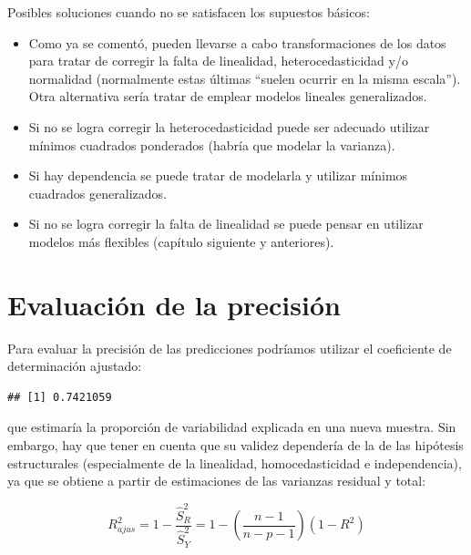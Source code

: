 \documentclass[
]{book}
\newenvironment{Shaded}{\begin{snugshade}}{\end{snugshade}}
\newcommand{\FunctionTok}[1]{\textcolor[rgb]{0.00,0.00,0.00}{#1}}
\newcommand{\NormalTok}[1]{#1}
\newcommand{\SpecialCharTok}[1]{\textcolor[rgb]{0.00,0.00,0.00}{#1}}
\theoremstyle{break}
\theoremstyle{definition}
\theoremstyle{definition}
\theoremstyle{definition}
\theoremstyle{definition}
\theoremstyle{remark}
\begin{document}
Posibles soluciones cuando no se satisfacen los supuestos básicos:

\begin{itemize}
\item
  Como ya se comentó, pueden llevarse a cabo transformaciones de los datos para tratar de
  corregir la falta de linealidad, heterocedasticidad y/o normalidad
  (normalmente estas últimas ``suelen ocurrir en la misma escala'').
  Otra alternativa sería tratar de emplear modelos lineales generalizados.
\item
  Si no se logra corregir la heterocedasticidad puede ser adecuado
  utilizar mínimos cuadrados ponderados (habría que modelar la varianza).
\item
  Si hay dependencia se puede tratar de modelarla y utilizar mínimos
  cuadrados generalizados.
\item
  Si no se logra corregir la falta de linealidad se puede pensar en
  utilizar modelos más flexibles (capítulo siguiente y anteriores).
\end{itemize}

\hypertarget{evaluaciuxf3n-de-la-precisiuxf3n}{%
\section{Evaluación de la precisión}\label{evaluaciuxf3n-de-la-precisiuxf3n}}

Para evaluar la precisión de las predicciones podríamos utilizar el coeficiente de determinación ajustado:

\begin{Shaded}
\end{Shaded}

\begin{verbatim}
## [1] 0.7421059
\end{verbatim}

que estimaría la proporción de variabilidad explicada en una nueva muestra.
Sin embargo, hay que tener en cuenta que su validez dependería de la de las hipótesis estructurales (especialmente de la linealidad, homocedasticidad e independencia), ya que se obtiene a partir de estimaciones de las varianzas residual y total:

\[R_{ajus}^{2} = 1 - \frac{\hat{S}_{R}^{2}}{\hat{S}_{Y}^{2}} 
= 1 - \left( \frac{n-1}{n-p-1} \right) (1-R^{2})\]
\end{document}
